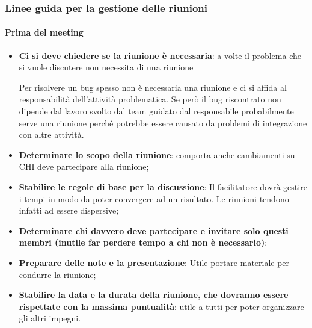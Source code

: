 \subsubsection{Linee guida per la gestione delle riunioni}
\paragraph{Prima del meeting}
\begin{itemize}
	\item \textbf{Ci si deve chiedere se la riunione è necessaria}: a volte il problema che si vuole discutere non necessita di una riunione 
	\begin{info}[Esempio]
		Per risolvere un bug spesso non è necessaria una riunione e ci si affida al responsabilità dell'attività problematica. Se però il bug riscontrato non dipende dal lavoro svolto dal team guidato dal responsabile probabilmente serve una riunione perché potrebbe essere causato da problemi di integrazione con altre attività.
	\end{info}
	\item \textbf{Determinare lo scopo della riunione}: comporta anche cambiamenti su CHI deve partecipare alla riunione;
	\item \textbf{Stabilire le regole di base per la discussione}: Il facilitatore dovrà gestire i tempi in modo da poter convergere ad un risultato. Le riunioni tendono infatti ad essere dispersive;
	\item \textbf{Determinare chi davvero deve partecipare e invitare solo questi membri (inutile far perdere tempo a chi non è necessario)};
	\item \textbf{Preparare delle note e la presentazione}: Utile portare materiale per condurre la riunione;
	\item \textbf{Stabilire la data e la durata della riunione, che dovranno essere rispettate con la massima puntualità}: utile a tutti per poter organizzare gli altri impegni.
\end{itemize}

